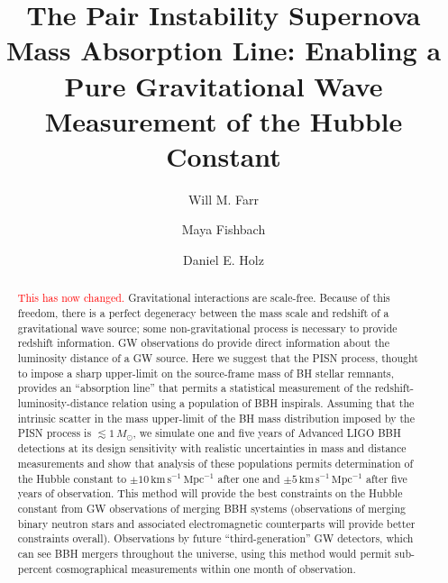 \documentclass[modern]{aastex62}
\newcommand{\fixme}[1]{\textcolor{red}{#1}}
\newcommand{\fiveYearUncert}{5 \, \kmsMpc}
\newcommand{\oneYearUncert}{10 \, \kmsMpc}
\newcommand{\kmsMpc}{\mathrm{km} \, \mathrm{s}^{-1} \, \mathrm{Mpc}^{-1}}
\newcommand{\MSun}{M_\odot}
\begin{document}
\title{The Pair Instability Supernova Mass Absorption Line: Enabling a Pure
Gravitational Wave Measurement of the Hubble Constant}

\author[0000-0003-1540-8562]{Will M. Farr}

\author[0000-0002-1980-5293]{Maya Fishbach}

\author[0000-0002-0175-5064]{Daniel E. Holz}

\begin{abstract}
%
  \fixme{This has now changed.}
  Gravitational interactions are scale-free.  Because of this freedom, there is
  a perfect degeneracy between the mass scale and redshift of a gravitational
  wave source; some non-gravitational process is necessary to provide redshift
  information. \Ac{GW} observations do provide direct information about the
  luminosity distance of a \ac{GW} source.  Here we suggest that the \ac{PISN}
  process, thought to impose a sharp upper-limit on the source-frame mass of
  \ac{BH} stellar remnants, provides an ``absorption line'' that permits a
  statistical measurement of the redshift-luminosity-distance relation using a
  population of \ac{BBH} inspirals.  Assuming that the intrinsic scatter in the
  mass upper-limit of the \ac{BH} mass distribution imposed by the \ac{PISN}
  process is $\lesssim 1\,\MSun$, we simulate one and five years of Advanced
  LIGO \ac{BBH} detections at its design sensitivity with realistic
  uncertainties in mass and distance measurements and show that analysis of
  these populations permits determination of the Hubble constant to $\pm
  \oneYearUncert$ after one and $\pm \fiveYearUncert$ after five years of
  observation.  This method will provide the best constraints on the Hubble
  constant from \ac{GW} observations of merging \ac{BBH} systems (observations
  of merging binary neutron stars and associated electromagnetic counterparts
  will provide better constraints overall). Observations by future
  ``third-generation'' \ac{GW} detectors, which can see \ac{BBH} mergers
  throughout the universe, using this method would permit sub-percent
  cosmographical measurements within one month of observation.
%
\end{abstract}
\end{document}
